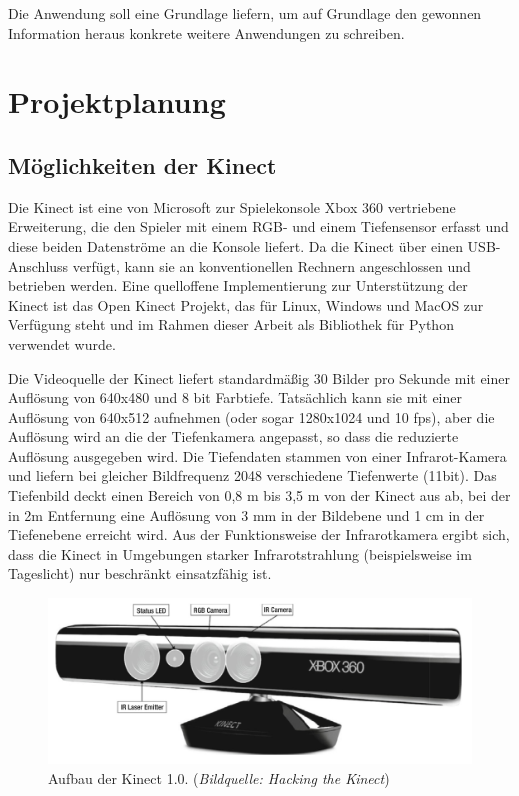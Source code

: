 \documentclass[12pt,a4paper,ngerman]{scrartcl}
\begin{document}
Die Anwendung soll eine Grundlage liefern, um auf Grundlage den gewonnen Information
heraus konkrete weitere Anwendungen zu schreiben.


\section{Projektplanung}

\subsection{Möglichkeiten der Kinect}
\label{sec:kinect}

Die Kinect ist eine von Microsoft zur Spielekonsole Xbox 360 vertriebene Erweiterung,
die den Spieler mit einem RGB- und einem Tiefensensor erfasst und diese beiden
Datenströme an die Konsole liefert. Da die Kinect über einen USB-Anschluss verfügt,
kann sie an konventionellen Rechnern angeschlossen und betrieben werden. Eine
quelloffene Implementierung zur Unterstützung der Kinect ist das Open Kinect Projekt,
das für Linux, Windows und MacOS zur Verfügung steht und im Rahmen dieser Arbeit
als Bibliothek für Python verwendet wurde.\cite{openkinect}\cite{libfreenect}

Die Videoquelle der Kinect liefert standardmäßig 30 Bilder pro Sekunde mit einer
Auflösung von 640x480 und 8 bit Farbtiefe. Tatsächlich kann sie mit
einer Auflösung von 640x512 aufnehmen (oder sogar 1280x1024 und 10 fps), aber die
Auflösung wird an die der Tiefenkamera angepasst, so dass die reduzierte Auflösung
ausgegeben wird. Die Tiefendaten stammen von einer
Infrarot-Kamera und liefern bei gleicher Bildfrequenz 2048 verschiedene
Tiefenwerte (11bit). Das Tiefenbild deckt einen Bereich von 0,8 m bis 3,5 m von der
Kinect aus ab, bei der in 2m Entfernung eine Auflösung von 3 mm in der Bildebene und
1 cm in der Tiefenebene erreicht wird. Aus der Funktionsweise der Infrarotkamera
ergibt sich, dass die Kinect in Umgebungen starker Infrarotstrahlung (beispielsweise
im Tageslicht) nur beschränkt einsatzfähig ist.\cite{hacking}

\begin{figure}[H]
    \centering
    \includegraphics[scale=0.33]{img/kinect_components.jpg}
    \caption{Aufbau der Kinect 1.0. ({\em Bildquelle: Hacking the Kinect\cite{hacking}})}
\end{figure}
\end{document}
